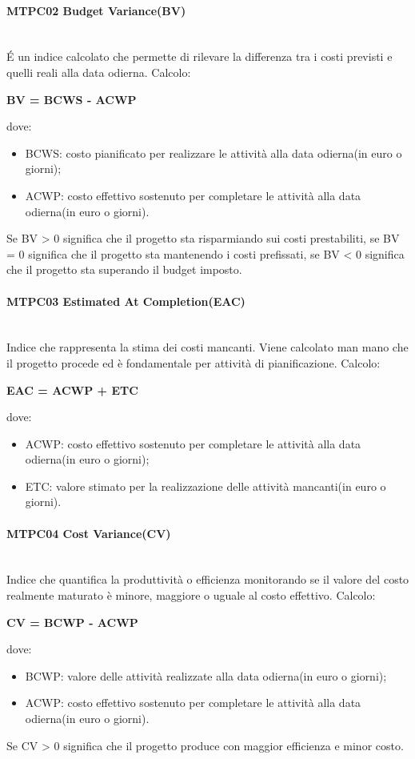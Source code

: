 \paragraph{MTPC02 Budget Variance(BV)}\-\\
\'E un indice calcolato che permette di rilevare la differenza tra i costi previsti e quelli reali alla data odierna. 
Calcolo:
\begin{center}
	\item \textbf{BV = BCWS - ACWP}
\end{center} 
dove:
\begin{itemize}
	\item BCWS: costo pianificato per realizzare le attività alla data odierna(in euro o giorni);
	\item ACWP: costo effettivo sostenuto per completare le attività alla data odierna(in euro o giorni).
\end{itemize}
Se BV > 0 significa che il progetto sta risparmiando sui costi prestabiliti, se BV = 0 significa che il progetto sta mantenendo i costi prefissati, se BV < 0 significa che il progetto sta superando il budget imposto.

\paragraph{MTPC03 Estimated At Completion(EAC)}\-\\
Indice che rappresenta la stima dei costi mancanti. Viene calcolato man mano che il progetto procede ed è fondamentale per attività di pianificazione.
Calcolo:
\begin{center}
	\item \textbf{EAC = ACWP + ETC}
\end{center}
dove:
\begin{itemize}
	\item ACWP: costo effettivo sostenuto per completare le attività alla data odierna(in euro o giorni);
	\item ETC: valore stimato per la realizzazione delle attività mancanti(in euro o giorni).
\end{itemize}

\paragraph{MTPC04 Cost Variance(CV)}\-\\
Indice che quantifica la produttività o efficienza monitorando se il valore del costo realmente maturato è minore, maggiore o uguale al costo effettivo.
Calcolo:
\begin{center}
	\item \textbf{CV = BCWP - ACWP}
\end{center}
dove:
\begin{itemize}
	\item BCWP: valore delle attività realizzate alla data odierna(in euro o giorni);
	\item ACWP: costo effettivo sostenuto per completare le attività alla data odierna(in euro o giorni).
\end{itemize}
Se CV > 0 significa che il progetto produce con maggior efficienza e minor costo.

